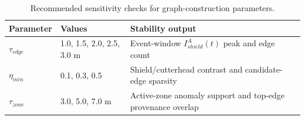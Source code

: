 \begin{table}[!htbp]
\centering
\caption{Recommended sensitivity checks for graph-construction parameters.}
\label{tab:sensitivity_design}
\small
\begin{tabular}{@{}p{}p{}p{}@{}}
\toprule
Parameter & Values & Stability output \\
\midrule
$\tau_{edge}$ & 1.0, 1.5, 2.0, 2.5, 3.0 m & Event-window $I_{shield}^{A}(t)$ peak and edge count \\
$\eta_{min}$ & 0.1, 0.3, 0.5 & Shield/cutterhead contrast and candidate-edge sparsity \\
$\tau_{zone}$ & 3.0, 5.0, 7.0 m & Active-zone anomaly support and top-edge provenance overlap \\
\bottomrule
\end{tabular}
\end{table}
